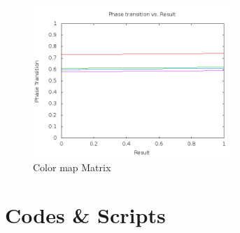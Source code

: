 \documentclass[twocolumn]{article}
\begin{document}
\begin{figure}[h!]
\begin{center}
\includegraphics[width=3in]{contesini-figure2.png}
\caption{Color map Matrix}
\label{Color map Matrix}
\end{center}
\end{figure}

\section{Codes & Scripts}
\end{document}
